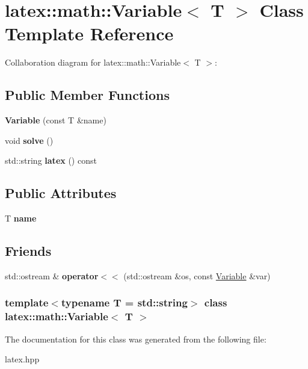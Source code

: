 \hypertarget{classlatex_1_1math_1_1Variable}{\section{latex\-:\-:math\-:\-:\-Variable$<$ \-T $>$ \-Class \-Template \-Reference}
\label{classlatex_1_1math_1_1Variable}
}


\-Collaboration diagram for latex\-:\-:math\-:\-:\-Variable$<$ \-T $>$\-:
\subsection*{\-Public \-Member \-Functions}
\begin{DoxyCompactItemize}
\item 
\hypertarget{classlatex_1_1math_1_1Variable_a2844e58e3a136631a4180811d6773f01}{{\bfseries \-Variable} (const \-T \&name)}\label{classlatex_1_1math_1_1Variable_a2844e58e3a136631a4180811d6773f01}

\item 
\hypertarget{classlatex_1_1math_1_1Variable_a3b9a17bd28ddfaf85c5634e6a8c7144d}{void {\bfseries solve} ()}\label{classlatex_1_1math_1_1Variable_a3b9a17bd28ddfaf85c5634e6a8c7144d}

\item 
\hypertarget{classlatex_1_1math_1_1Variable_adcd90cb19f6793a54b6571cc30d42e07}{std\-::string {\bfseries latex} () const }\label{classlatex_1_1math_1_1Variable_adcd90cb19f6793a54b6571cc30d42e07}

\end{DoxyCompactItemize}
\subsection*{\-Public \-Attributes}
\begin{DoxyCompactItemize}
\item 
\hypertarget{classlatex_1_1math_1_1Variable_a48cda4ab42456ea087dfe149653a1972}{\-T {\bfseries name}}\label{classlatex_1_1math_1_1Variable_a48cda4ab42456ea087dfe149653a1972}

\end{DoxyCompactItemize}
\subsection*{\-Friends}
\begin{DoxyCompactItemize}
\item 
\hypertarget{classlatex_1_1math_1_1Variable_a501b51eeedf7e93b817dc202b14a44a7}{std\-::ostream \& {\bfseries operator$<$$<$} (std\-::ostream \&os, const \hyperlink{classlatex_1_1math_1_1Variable}{\-Variable} \&var)}\label{classlatex_1_1math_1_1Variable_a501b51eeedf7e93b817dc202b14a44a7}

\end{DoxyCompactItemize}
\subsubsection*{template$<$typename T = std\-::string$>$ class latex\-::math\-::\-Variable$<$ T $>$}



\-The documentation for this class was generated from the following file\-:\begin{DoxyCompactItemize}
\item 
latex.\-hpp\end{DoxyCompactItemize}

